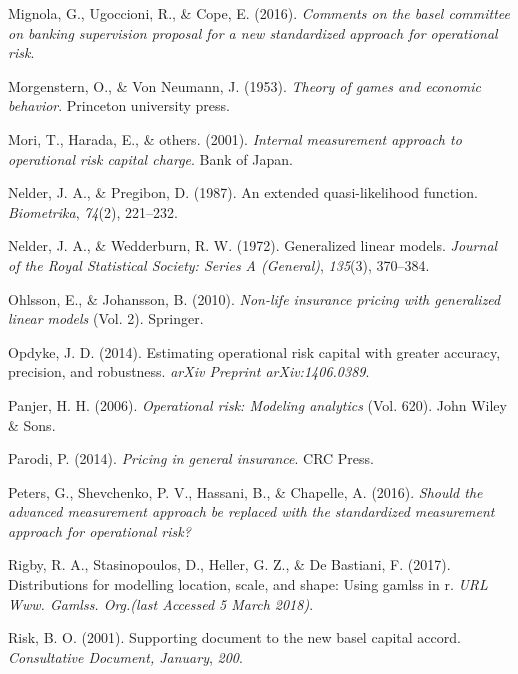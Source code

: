 \documentclass{DissertateUSU}
\begin{document}
\leavevmode\hypertarget{ref-mignola2016comments}{}%
Mignola, G., Ugoccioni, R., \& Cope, E. (2016). \emph{Comments on the
basel committee on banking supervision proposal for a new standardized
approach for operational risk}.

\leavevmode\hypertarget{ref-morgenstern1953theory}{}%
Morgenstern, O., \& Von Neumann, J. (1953). \emph{Theory of games and
economic behavior}. Princeton university press.

\leavevmode\hypertarget{ref-mori2001internal}{}%
Mori, T., Harada, E., \& others. (2001). \emph{Internal measurement
approach to operational risk capital charge}. Bank of Japan.

\leavevmode\hypertarget{ref-nelder1987extended}{}%
Nelder, J. A., \& Pregibon, D. (1987). An extended quasi-likelihood
function. \emph{Biometrika}, \emph{74}(2), 221--232.

\leavevmode\hypertarget{ref-nelder1972generalized}{}%
Nelder, J. A., \& Wedderburn, R. W. (1972). Generalized linear models.
\emph{Journal of the Royal Statistical Society: Series A (General)},
\emph{135}(3), 370--384.

\leavevmode\hypertarget{ref-ohlsson2010non}{}%
Ohlsson, E., \& Johansson, B. (2010). \emph{Non-life insurance pricing
with generalized linear models} (Vol. 2). Springer.

\leavevmode\hypertarget{ref-opdyke2014estimating}{}%
Opdyke, J. D. (2014). Estimating operational risk capital with greater
accuracy, precision, and robustness. \emph{arXiv Preprint
arXiv:1406.0389}.

\leavevmode\hypertarget{ref-panjer2006operational}{}%
Panjer, H. H. (2006). \emph{Operational risk: Modeling analytics} (Vol.
620). John Wiley \& Sons.

\leavevmode\hypertarget{ref-parodi2014pricing}{}%
Parodi, P. (2014). \emph{Pricing in general insurance}. CRC Press.

\leavevmode\hypertarget{ref-peters2016should}{}%
Peters, G., Shevchenko, P. V., Hassani, B., \& Chapelle, A. (2016).
\emph{Should the advanced measurement approach be replaced with the
standardized measurement approach for operational risk?}

\leavevmode\hypertarget{ref-rigby2017distributions}{}%
Rigby, R. A., Stasinopoulos, D., Heller, G. Z., \& De Bastiani, F.
(2017). Distributions for modelling location, scale, and shape: Using
gamlss in r. \emph{URL Www. Gamlss. Org.(last Accessed 5 March 2018)}.

\leavevmode\hypertarget{ref-risk2001supporting}{}%
Risk, B. O. (2001). Supporting document to the new basel capital accord.
\emph{Consultative Document, January}, \emph{200}.
\end{document}
